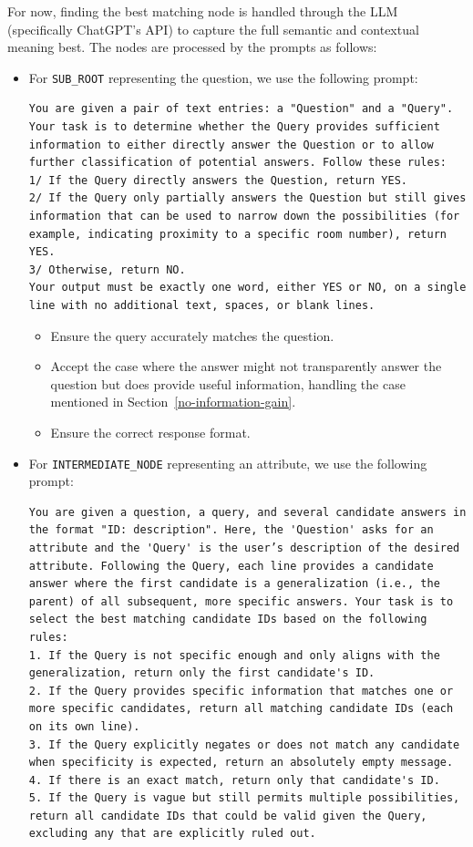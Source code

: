 For now, finding the best matching node is handled through the LLM (specifically ChatGPT's API) to capture the full semantic and contextual meaning best. The nodes are processed by the prompts as follows:
\begin{itemize}
    \item For \texttt{SUB\_ROOT} representing the question, we use the following prompt:
\begin{lstlisting}[style=cSharp]
You are given a pair of text entries: a "Question" and a "Query". Your task is to determine whether the Query provides sufficient information to either directly answer the Question or to allow further classification of potential answers. Follow these rules:
1/ If the Query directly answers the Question, return YES.
2/ If the Query only partially answers the Question but still gives information that can be used to narrow down the possibilities (for example, indicating proximity to a specific room number), return YES.
3/ Otherwise, return NO.
Your output must be exactly one word, either YES or NO, on a single line with no additional text, spaces, or blank lines.
\end{lstlisting}
    \begin{itemize}
        \item Ensure the query accurately matches the question.
        \item Accept the case where the answer might not transparently answer the question but does provide useful information, handling the case mentioned in Section~\ref{no-information-gain}.
        \item Ensure the correct response format.
    \end{itemize}
    
    \item For \texttt{INTERMEDIATE\_NODE} representing an attribute, we use the following prompt:
\begin{lstlisting}[style=cSharp]
You are given a question, a query, and several candidate answers in the format "ID: description". Here, the 'Question' asks for an attribute and the 'Query' is the user’s description of the desired attribute. Following the Query, each line provides a candidate answer where the first candidate is a generalization (i.e., the parent) of all subsequent, more specific answers. Your task is to select the best matching candidate IDs based on the following rules:
1. If the Query is not specific enough and only aligns with the generalization, return only the first candidate's ID.
2. If the Query provides specific information that matches one or more specific candidates, return all matching candidate IDs (each on its own line).
3. If the Query explicitly negates or does not match any candidate when specificity is expected, return an absolutely empty message.
4. If there is an exact match, return only that candidate's ID.
5. If the Query is vague but still permits multiple possibilities, return all candidate IDs that could be valid given the Query, excluding any that are explicitly ruled out.


\end{lstlisting}
\end{itemize}
